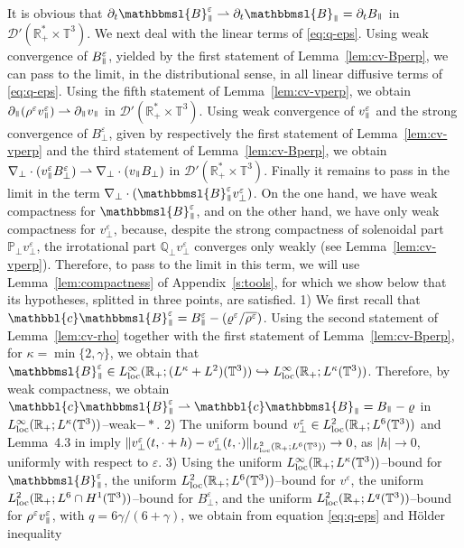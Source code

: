 \documentclass[11pt,reqno]{amsart}
\def \R{{\mathbb{R}}}
\def \Q{{\mathbb{Q}}}
\def \T{{\mathbb{T}}}
\def \P{{\mathbb{P}}}
\newcommand{\myparallel}{{\mkern3mu\vphantom{\perp}\vrule depth 0pt\mkern2mu\vrule depth 0pt\mkern3mu}}
\begin{document}
It is obvious that $ \partial_t \mathbbmsl{ B}_\myparallel^\varepsilon  \rightharpoonup  \partial_t \mathbbmsl{B}_\myparallel = \partial_t B_\myparallel $ in $\mathcal D'(\R_+^* \times \T^3)$. We next deal with the linear terms of \eqref{eq:q-eps}. Using weak convergence of $B_\myparallel^\varepsilon$, yielded by the first statement of Lemma~\ref{lem:cv-Bperp}, we can pass to the limit, in the distributional sense, in all linear diffusive terms of \eqref{eq:q-eps}. Using the fifth statement of  Lemma~\ref{lem:cv-vperp}, we obtain $\partial_\myparallel (\rho^\varepsilon v_\myparallel^\varepsilon) \rightharpoonup \partial_\myparallel v_\myparallel$ in $\mathcal D'(\R_+^* \times \T^3)$. Using weak convergence of $ v_\myparallel^\varepsilon$ and the strong convergence of $B_\perp^\varepsilon$, given  by respectively the first statement of Lemma~\ref{lem:cv-vperp} and the third statement of  Lemma~\ref{lem:cv-Bperp}, we obtain $\nabla_\perp \cdot(v_\myparallel^\varepsilon B_\perp^\varepsilon) \rightharpoonup \nabla_\perp \cdot(v_\myparallel B_\perp)$ in  $\mathcal D'(\R_+^* \times \T^3)$. Finally it remains to pass in the limit in the term $\nabla_\perp \cdot(\mathbbmsl{B}_\myparallel^\varepsilon  v_\perp^\varepsilon)$. On the one hand, we have weak compactness for $\mathbbmsl{B}_\myparallel^\varepsilon $, and on the other hand, we have only weak compactness for $v_\perp^\varepsilon$, because, despite the strong compactness of solenoidal part $\P_\perp v_\perp^\varepsilon$, the irrotational part $\Q_\perp v_\perp^\varepsilon$ converges only weakly (see Lemma~\ref{lem:cv-vperp}). Therefore, to pass to the limit in this term, we will use  Lemma~\ref{lem:compactness} of Appendix~\ref{s:tools}, for which we show below that its hypotheses, splitted in three points, are satisfied. 1) We first recall that $ \mathbbl{c}\mathbbmsl{B}_\myparallel^\varepsilon = B_\myparallel^\varepsilon - ( \varrho^\varepsilon/\overline{\rho^\varepsilon} ) $. Using the second statement of Lemma~\ref{lem:cv-rho} together with the first statement of Lemma~\ref{lem:cv-Bperp}, for $\kappa=\min\{2,\gamma\}$, we obtain that $ \mathbbmsl{B}_\myparallel^\varepsilon \in L_{\rm loc}^\infty(\R_+; (L^\kappa+L^2)(\T^3)) \hookrightarrow L_{\rm loc}^\infty(\R_+;L^\kappa(\T^3))$. Therefore, by weak compactness, we obtain $ \mathbbl{c}  \mathbbmsl{B}_\myparallel^\varepsilon \rightharpoonup  \mathbbl{c} \mathbbmsl{B}_\myparallel = B_\myparallel  - \varrho $
in $L_{\rm loc}^\infty(\R_+;L^\kappa(\T^3))$--weak$-*$. 2) The uniform bound $v_\perp^\varepsilon \in  L_{\rm loc}^2(\R_+; L^6(\T^3))$ and Lemma~4.3 in \cite{Bre11} imply $\|v_\perp^\varepsilon (t,\cdot +h )- v_\perp^\varepsilon (t,\cdot )\|_{L_{\rm loc}^2(\R_+; L^6(\T^3))} \rightarrow 0$, as $|h|\rightarrow 0$, uniformly with respect to $\varepsilon$. 3) Using the uniform $L_{\rm loc}^\infty(\R_+;L^\kappa(\T^3))$--bound for $ \mathbbmsl{B}_\myparallel^\varepsilon $,  the uniform $L_{\rm loc}^2(\R_+;L^6(\T^3))$--bound for  $v^\varepsilon$, the uniform $L_{\rm loc}^2(\R_+;L^6\cap H^1(\T^3))$--bound for $B_\perp^\varepsilon$, and the uniform  $L_{\rm loc}^2(\R_+;L^q(\T^3))$--bound for $\rho^\varepsilon v_\myparallel^\varepsilon$, with  $q=6\gamma/(6+\gamma)$, we obtain from equation \eqref{eq:q-eps} and H\"older inequality
\end{document}

